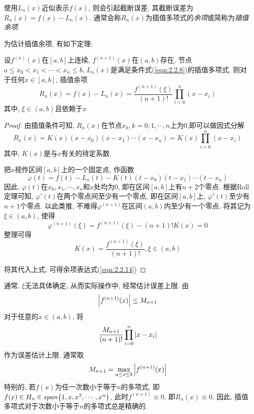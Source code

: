 使用$L_n(x)$近似表示$f(x)$, 则会引起截断误差. 其截断误差为$R_n(x)=f(x)-L_n(x)$. 通常会称$R_n(x)$为插值多项式的\emph{余项}或简称为\emph{插值余项}.

为估计插值余项, 有如下定理:

\begin{theorem}
    设$f^{(n)}(x)$在$[a,b]$上连续, $f^{(n+1)}(x)$在$(a,b)$存在, 节点$a\le x_0<x_1<\cdots<x_n\le b$, $L_n(x)$是满足条件式(\ref{eqn:2.2.8})的插值多项式, 则对于任何$x\in[a,b]$, 插值余项
    \begin{equation}\label{eqn:2.2.14}
        R_n(x)=f(x)-L_n(x)=\frac{f^{(n+1)}(\xi)}{(n+1)!}\prod_{i=0}^n(x-x_i)
    \end{equation}
    其中, $\xi\in(a,b)$且依赖于$x$
\end{theorem}

\begin{proof}
    由插值条件可知, $R_n(x)$在节点$x_k,k=0,1,\cdots,n$上为0,即可以做因式分解
    \begin{equation*}
        R_n(x)=K(x)(x-x_0)(x-x_1)\cdots(x-x_n)=K(x)\prod_{i=0}^n(x-x_i)
    \end{equation*}
    其中, $K(x)$是与$x$有关的待定系数.

    把$x$视作区间$[a,b]$上的一个固定点, 作函数
    \begin{equation*}
        \varphi(t)=f(t)-L_n(t)-K(t)(t-x_0)(t-x_1)\cdots(t-x_n)
    \end{equation*}
    因此, $\varphi(t)$在$x_0,x_1,\cdots,x_n$和$x$处均为0, 即在区间$[a,b]$上有$n+2$个零点. 根据Roll定理可知, $\varphi'(t)$在两个零点间至少有一个零点, 即在区间$[a,b]$上, $\varphi'(t)$至少有$n+1$个零点. 以此类推, 不难得$\varphi^{(n+1)}$在区间$(a,b)$内至少有一个零点, 将其记为$\xi\in(a,b)$, 使得
    \begin{equation*}
        \varphi^{(n+1)}(\xi)=f^{(n+1)}(\xi)-(n+1)!K(x)=0
    \end{equation*}
    整理可得
    \begin{equation*}
        K(x)=\frac{f^{(n+1)}(\xi)}{(n+1)!}, \xi\in(a,b)
    \end{equation*}

    将其代入上式, 可得余项表达式(\ref{eqn:2.2.14})
\end{proof}

通常, $\xi$无法具体确定, 从而实际操作中, 经常估计误差上限. 由
\begin{equation*}
    \abs{f^{(n+1)}(x)}\le M_{n+1}
\end{equation*}
对于任意的$x\in(a,b)$, 将
\begin{equation*}
    \frac{M_{n+1}}{(n+1)!}\prod_{i=0}^n\abs{x-x_i}
\end{equation*}
作为误差估计上限. 通常取
\begin{equation*}
    M_{n+1}=\max_{a\le x\le b}\abs{f^{(n+1)}(x)}
\end{equation*}
特别的, 若$f(x)$为任一次数小于等于$n$的多项式, 即$f(x)\in H_n\in span\{1,x,x^2,\cdots,x^n\}$, 此时$f^{(n+1)}\equiv0$, 即$R_n(x)\equiv 0$. 因此, 插值多项式对于次数小于等于$n$的多项式总是精确的.

